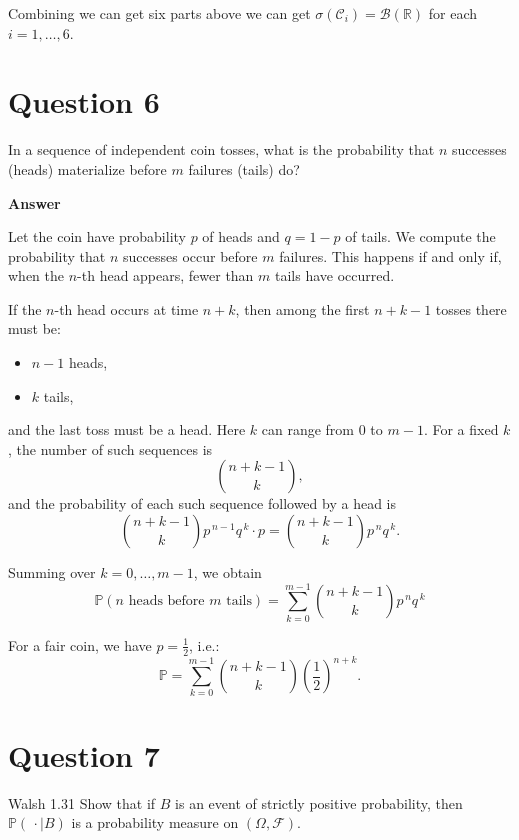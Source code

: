 \documentclass[letterpaper]{article}
\begin{document}
			\medskip
			Combining we can get six parts above we can get $\sigma(\mathcal{C}_i)=\mathcal{B}(\mathbb{R})$ for each $i=1,\dots,6$.
		
		
		\clearpage
		
		\section{Question 6}
		
		 In a sequence of independent coin tosses, what is the probability that $n$ successes (heads) materialize before $m$ failures (tails) do?
		 
		 	\textbf{Answer}
		 	
		 	Let the coin have probability $p$ of heads and $q=1-p$ of tails.
		 	We compute the probability that $n$ successes occur before $m$ failures. This happens if and only if, when the $n$-th head appears, fewer than
		 	$m$ tails have occurred.
		 	
		 	If the $n$-th head occurs at time $n+k$, then among the first $n+k-1$
		 	tosses there must be:
		 	
		 	\begin{itemize}
		 		\item $n-1$ heads,
		 		\item $k$ tails,
		 	\end{itemize}
		 	
		 	and the last toss must be a head. Here $k$ can range from $0$ to $m-1$. For a fixed $k$, the number of such sequences is
		 	\[
		 	\binom{n+k-1}{k},
		 	\]
		 	and the probability of each such sequence followed by a head is
		 	\[
		 	\binom{n+k-1}{k} p^{\,n-1} q^{\,k} \cdot p
		 	=
		 	\binom{n+k-1}{k} p^{\,n} q^{\,k}.
		 	\]
		 	
		 	Summing over $k=0,\dots,m-1$, we obtain
		 	\[
		 	{
		 		\mathbb{P}(\text{$n$ heads before $m$ tails})
		 		=
		 		\sum_{k=0}^{m-1}
		 		\binom{n+k-1}{k}
		 		p^{\,n} q^{\,k}
		 	}
		 	\]
		 	
		 	\medskip
		 	
		 	For a fair coin, we have $p=\tfrac12$, i.e.:
		 	\[
		 	\mathbb{P}
		 	=
		 	\sum_{k=0}^{m-1}
		 	\binom{n+k-1}{k}
		 	\left(\frac12\right)^{n+k}.
		 	\]
		 	
		 
		 \clearpage
		
		
		
		\section{Question 7}
		{\color{deepred} Walsh 1.31} Show that if $B$ is an event of strictly positive probability, then
		$\mathbb{P}(\,\cdot \mid B)$ is a probability measure on $(\Omega,\mathcal{F})$.
		
\end{document}
